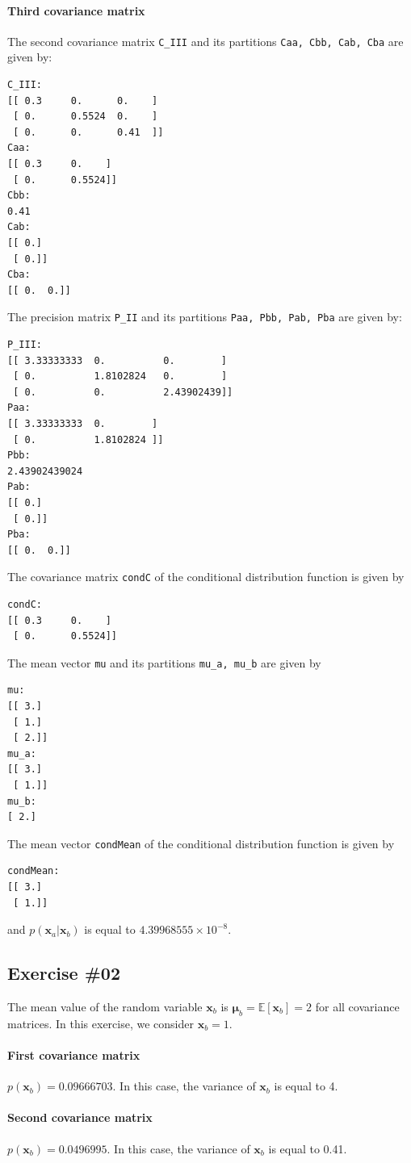 \documentclass[a4paper,12pt]{article}
\newcommand{\mb}[1]{\ensuremath{\mathbf{#1}}}
\newcommand{\mbb}[1]{\ensuremath{\mathbb{#1}}}
\begin{document}
\paragraph{Third covariance matrix} The second covariance matrix \verb|C_III| and its partitions \verb|Caa, Cbb, Cab, Cba| are given by:
\begin{verbatim}
C_III:
[[ 0.3     0.      0.    ]
 [ 0.      0.5524  0.    ]
 [ 0.      0.      0.41  ]]
Caa:
[[ 0.3     0.    ]
 [ 0.      0.5524]]
Cbb:
0.41
Cab:
[[ 0.]
 [ 0.]]
Cba:
[[ 0.  0.]]
\end{verbatim}
The precision matrix \verb|P_II| and its partitions \verb|Paa, Pbb, Pab, Pba| are given by:
\begin{verbatim}
P_III:
[[ 3.33333333  0.          0.        ]
 [ 0.          1.8102824   0.        ]
 [ 0.          0.          2.43902439]]
Paa:
[[ 3.33333333  0.        ]
 [ 0.          1.8102824 ]]
Pbb:
2.43902439024
Pab:
[[ 0.]
 [ 0.]]
Pba:
[[ 0.  0.]]
\end{verbatim}
The covariance matrix \verb|condC| of the conditional distribution function is given by
\begin{verbatim}
condC:
[[ 0.3     0.    ]
 [ 0.      0.5524]]
\end{verbatim}
The mean vector \verb|mu| and its partitions \verb|mu_a, mu_b| are given by
\begin{verbatim}
mu:
[[ 3.]
 [ 1.]
 [ 2.]]
mu_a:
[[ 3.]
 [ 1.]]
mu_b:
[ 2.]
\end{verbatim}
The mean vector \verb|condMean| of the conditional distribution function is given by
\begin{verbatim}
condMean:
[[ 3.]
 [ 1.]]
\end{verbatim}
and $p(\mb{x}_a|\mb{x}_b)$ is equal to $4.39968555 \times 10^{-8}$.

\subsection*{Exercise \#02}
The mean value of the random variable $\mb{x}_b$ is $\mb{\mu}_b = \mbb{E}[\mb{x}_b] = 2$ for all covariance matrices. In this exercise, we consider $\mb{x}_b = 1$.
\paragraph{First covariance matrix}  $p(\mb{x}_b) = 0.09666703$. In this case, the variance of $\mb{x}_b$ is equal to 4.

\paragraph{Second covariance matrix} $p(\mb{x}_b) = 0.0496995$. In this case, the variance of $\mb{x}_b$ is equal to 0.41.
\end{document}
